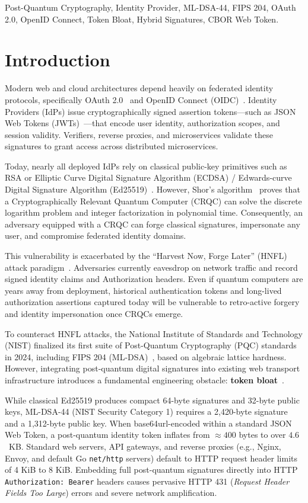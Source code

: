 \documentclass[conference]{IEEEtran}
\begin{document}
\begin{IEEEkeywords}
Post-Quantum Cryptography, Identity Provider, ML-DSA-44, FIPS 204, OAuth 2.0, OpenID Connect, Token Bloat, Hybrid Signatures, CBOR Web Token.
\end{IEEEkeywords}

\section{Introduction}
Modern web and cloud architectures depend heavily on federated identity protocols, specifically OAuth 2.0~\cite{rfc6749,rfc6750} and OpenID Connect (OIDC)~\cite{oidc_core}. Identity Providers (IdPs) issue cryptographically signed assertion tokens---such as JSON Web Tokens (JWTs)~\cite{rfc7519}---that encode user identity, authorization scopes, and session validity. Verifiers, reverse proxies, and microservices validate these signatures to grant access across distributed microservices.

Today, nearly all deployed IdPs rely on classical public-key primitives such as RSA or Elliptic Curve Digital Signature Algorithm (ECDSA) / Edwards-curve Digital Signature Algorithm (Ed25519)~\cite{rfc8032}. However, Shor's algorithm~\cite{shor1994} proves that a Cryptographically Relevant Quantum Computer (CRQC) can solve the discrete logarithm problem and integer factorization in polynomial time. Consequently, an adversary equipped with a CRQC can forge classical signatures, impersonate any user, and compromise federated identity domains.

This vulnerability is exacerbated by the ``Harvest Now, Forge Later'' (HNFL) attack paradigm~\cite{mosca2018}. Adversaries currently eavesdrop on network traffic and record signed identity claims and Authorization headers. Even if quantum computers are years away from deployment, historical authentication tokens and long-lived authorization assertions captured today will be vulnerable to retro-active forgery and identity impersonation once CRQCs emerge.

To counteract HNFL attacks, the National Institute of Standards and Technology (NIST) finalized its first suite of Post-Quantum Cryptography (PQC) standards in 2024, including FIPS 204 (ML-DSA)~\cite{fips204}, based on algebraic lattice hardness. However, integrating post-quantum digital signatures into existing web transport infrastructure introduces a fundamental engineering obstacle: \textbf{token bloat}~\cite{kampanakis2022, paquin2023}.

While classical Ed25519 produces compact 64-byte signatures and 32-byte public keys, ML-DSA-44 (NIST Security Category 1) requires a 2,420-byte signature and a 1,312-byte public key. When base64url-encoded within a standard JSON Web Token, a post-quantum identity token inflates from $\approx 400$ bytes to over $4.6$~KB. Standard web servers, API gateways, and reverse proxies (e.g., Nginx, Envoy, and default Go \texttt{net/http} servers) default to HTTP request header limits of 4 KiB to 8 KiB. Embedding full post-quantum signatures directly into HTTP \texttt{Authorization: Bearer} headers causes pervasive HTTP 431 (\emph{Request Header Fields Too Large}) errors and severe network amplification.
\end{document}
